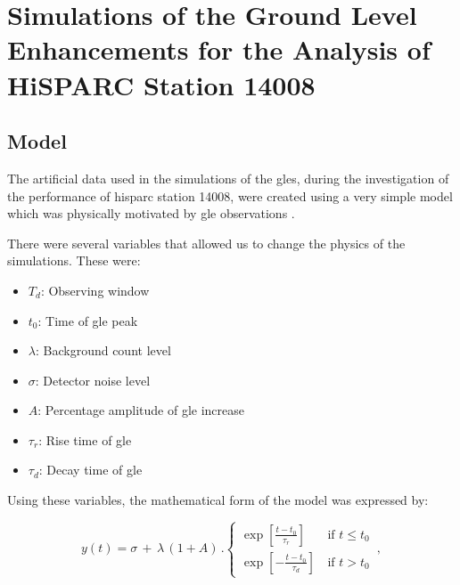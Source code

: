 \chapter{Simulations of the Ground Level Enhancements for the Analysis of HiSPARC Station 14008}\label{app:GLE_sims}


\section{Model}

The artificial data used in the simulations of the \glspl{gle}, during the investigation of the performance of \gls{hisparc} station 14008, were created using a very simple model which was physically motivated by \gls{gle} observations \citep{strauss_pulse_2017}.

There were several variables that allowed us to change the physics of the simulations. These were:

\begin{itemize}
	\item{{\bf $T_d$}: Observing window}
	\item{{\bf $t_0$}: Time of \gls{gle} peak}
	\item{{\bf $\lambda$}}: Background count level
	\item{{\bf $\sigma$}}: Detector noise level
	\item{{\bf $A$}: Percentage amplitude of \gls{gle} increase}
	\item{{\bf $\tau_r$}: Rise time of \gls{gle}}
	\item{{\bf $\tau_d$}: Decay time of \gls{gle}}
\end{itemize}

Using these variables, the mathematical form of the model was expressed by:

\begin{equation}
    y(t) =  \sigma \, + \, \lambda \, (1 + A) \, . 
\begin{cases}

\exp\left[{\frac{t - t_0}{\tau_r}}\right] \,  & \text{if           $t \leq t_0$} \\

\exp\left[{-\frac{t - t_0}{\tau_d}}\right] \,  & \text{if           $t > t_0$} 

\end{cases} \, ,
\label{eq:GLE_model}
\end{equation}

